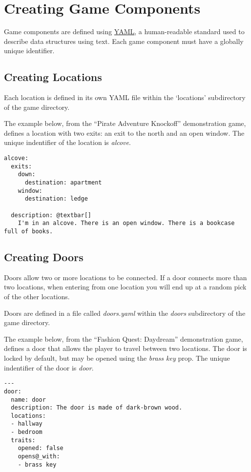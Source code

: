 \documentclass[letterpaper,10pt,english]{manual}
\begin{document}
\resetcurrentobjects
\hypertarget{--doc-components}{}

\chapter{Creating Game Components}

Game components are defined using \href{http://www.yaml.org/}{YAML}, a human-readable standard used to describe data structures using text. Each game component must have a globally unique identifier.


\section{Creating Locations}

Each location is defined in its own YAML file within the `locations' subdirectory of the game directory.

The example below, from the ``Pirate Adventure Knockoff'' demonstration game, defines a location with two exits: an exit to the north and an open window. The unique indentifier of the location is \emph{alcove}.

\begin{Verbatim}[commandchars=@\[\]]
alcove:
  exits:
    down:
      destination: apartment
    window:
      destination: ledge

  description: @textbar[]
    I'm in an alcove. There is an open window. There is a bookcase full of books.
\end{Verbatim}


\section{Creating Doors}

Doors allow two or more locations to be connected. If a door connects more than two locations, when entering from one location you will end up at a random pick of the other locations.

Doors are defined in a file called \emph{doors.yaml} within the \emph{doors} subdirectory of the game directory.

The example below, from the ``Fashion Quest: Daydream'' demonstration game, defines a door that allows the player to travel between two locations. The door is locked by default, but may be opened using the \emph{brass key} prop. The unique indentifier of the door is \emph{door}.

\begin{Verbatim}[commandchars=@\[\]]
---
door:
  name: door
  description: The door is made of dark-brown wood.
  locations:
  - hallway
  - bedroom
  traits:
    opened: false
    opens@_with:
    - brass key
\end{Verbatim}
\end{document}

